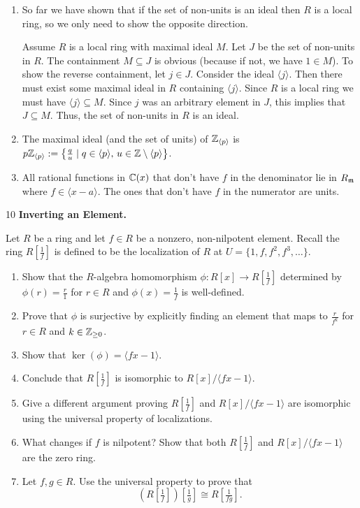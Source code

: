 \documentclass[Notebook.tex]{subfiles}
\begin{document}
\begin{solution}
\begin{enumerate}
		\item So far we have shown that if the set of non-units is an ideal then $R$ is a local ring, so we only need to show the opposite direction. 
		
		Assume $R$ is a local ring with maximal ideal $M$. Let $J$ be the set of non-units in $R$. The containment $M \subseteq J$ is obvious (because if not, we have $1 \in M$). To show the reverse containment, let $j \in J$. Consider the ideal $\langle j \rangle$. Then there must exist some maximal ideal in $R$ containing $\langle j \rangle$. Since $R$ is a local ring we must have $\langle j \rangle \subseteq M$. Since $j$ was an arbitrary element in $J$, this implies that $J \subseteq M$. Thus, the set of non-units in $R$ is an ideal. 

		\item The maximal ideal (and the set of units) of $\mathbb Z_{\langle p \rangle}$ is $p \mathbb Z_{\langle p \rangle} := \left\{\frac{q}{u} \mid q \in \langle p \rangle, \, u \in \mathbb Z \setminus \langle p \rangle \right\}$. 
		
		\item All rational functions in $\mathbb C(x)$ that don't have $f$ in the denominator lie in $R_{\operatorname{\mathfrak{m}}}$ where $f \in \langle x - a \rangle$. The ones that don't have $f$ in the numerator are units. 
	\end{enumerate}
\end{solution}


\newpage

\begin{problem}{10}
	\textbf{Inverting an Element.} 
	
	Let $R$ be a ring and let $f\in R$ be a nonzero, non-nilpotent element. Recall the ring $R\left [\frac{1}{f} \right ]$ is defined to be the localization of $R$ at $U=\{1,f,f^2,f^3,\ldots\}$. 
	\begin{enumerate}
		\item Show that the $R$-algebra homomorphism $\phi:R[x] \to R[\frac{1}{f}]$ determined by $\phi(r)=\frac{r}{1}$ for $r\in R$ and $\phi(x)=\frac{1}{f}$ is well-defined.
		\item Prove that $\phi$ is surjective by explicitly finding an element that maps to $\frac{r}{f^{k}}$ for $r\in R$ and $k\in \mathbb Z_{\geq0}$. 
		\item Show that $\ker(\phi) = \langle fx - 1\rangle$. 
		\item Conclude that $R[\frac{1}{f}]$ is isomorphic to $R[x]/\langle fx-1\rangle$.
		\item Give a different argument proving  $R[\frac{1}{f}]$ and $R[x]/\langle fx-1\rangle$ are isomorphic using the universal property of localizations. 
		\item What changes if $f$ is nilpotent? Show that both $R[\frac{1}{f}]$ and $R[x]/\langle fx-1\rangle$ are the zero ring.
		\item Let $f,g\in R$. Use the universal property to prove that
		\[
		\left(R\left[\tfrac{1}{f}\right]\right)\left[\tfrac{1}{g}\right]\cong R\left[\tfrac{1}{fg}\right].
		\]
	\end{enumerate}
\end{problem}
\end{document}
